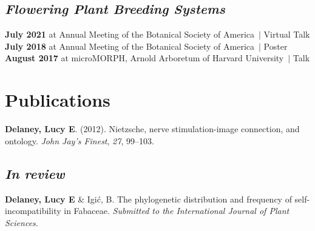 \documentclass[]{article}
\newlength{\cslhangindent}
\newenvironment{cslreferences}
{\setlength{\parindent}{0pt}
\everypar{\setlength{\hangindent}{\cslhangindent}}\ignorespaces}
{\par}
\begin{document}
\subsection{\fontsize{12}{36}\selectfont \textit{Flowering Plant Breeding Systems}}

\textbf{July 2021} at Annual Meeting of the Botanical Society of America\ $\vert$ Virtual Talk \hspace{0.3mm} \href{https://uofi.box.com/v/2021botany-talk}{\faVideo} \href{https://ledelaney.org/talks/2021botany}{\faImages} \href{https://github.com/ledelaney/07-21-Botany}{\faGithub}\\
\textbf{July 2018} at Annual Meeting of the Botanical Society of America\ $\vert$ Poster \hspace{0.4mm} \href{https://ledelaney.org/static/posters/poster.png}{\faFileImage}\\
\textbf{August 2017} at microMORPH, Arnold Arboretum of Harvard University\ $\vert$ Talk \hspace{0.4mm} \href{https://www.dropbox.com/s/o7hcg5riw97wf9i/08-2017-microMORPH.pdf?dl=1}{\faImages}



\section{\fontsize{16}{48}\selectfont Publications}

\begin{cslreferences}
\textbf{Delaney, Lucy E}. (2012). Nietzsche, nerve stimulation-image connection, and ontology. \emph{John Jay's Finest}, \emph{27}, 99--103. \href{https://ledelaney.org/static/docs/Delaney-JJAYFinest.pdf}{\faFile}\\
\end{cslreferences}

\vspace{-10mm}

\subsection{\fontsize{12}{36}\selectfont \textit{In review}}
\vspace{-2mm}
\begin{cslreferences}
\textbf{Delaney, Lucy E} \& Igić, B. The phylogenetic distribution and frequency of self-incompatibility in Fabaceae. \textit{Submitted to the International Journal of Plant Sciences}.
\end{cslreferences}
\vspace{-4mm}
\end{document}
